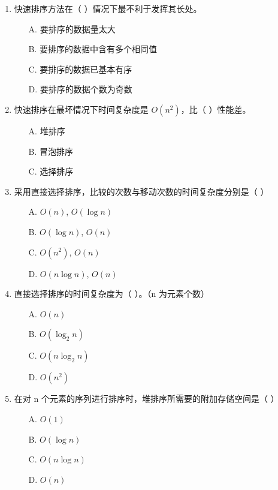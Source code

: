\documentclass[12pt, a4paper]{article}
\begin{document}
\begin{enumerate}[label=\arabic*.]
	\item 快速排序方法在（ ）情况下最不利于发挥其长处。
	      \begin{enumerate}
		      \item[A.] 要排序的数据量太大
		      \item[B.] 要排序的数据中含有多个相同值
		      \item[C.] 要排序的数据已基本有序
		      \item[D.] 要排序的数据个数为奇数
	      \end{enumerate}

	\item 快速排序在最坏情况下时间复杂度是 $O(n^2)$，比（ ）性能差。
	      \begin{enumerate}
		      \item[A.] 堆排序
		      \item[B.] 冒泡排序
		      \item[C.] 选择排序
	      \end{enumerate}

	\item 采用直接选择排序，比较的次数与移动次数的时间复杂度分别是（ ）
	      \begin{enumerate}
		      \item[A.] $O(n)$, $O(\log n)$
		      \item[B.] $O(\log n)$, $O(n)$
		      \item[C.] $O(n^2)$, $O(n)$
		      \item[D.] $O(n \log n)$, $O(n)$
	      \end{enumerate}

	\item 直接选择排序的时间复杂度为（ ）。（n 为元素个数）
	      \begin{enumerate}
		      \item[A.] $O(n)$
		      \item[B.] $O(\log_2 n)$
		      \item[C.] $O(n \log_2 n)$
		      \item[D.] $O(n^2)$
	      \end{enumerate}

	\item 在对 n 个元素的序列进行排序时，堆排序所需要的附加存储空间是（ ）
	      \begin{enumerate}
		      \item[A.] $O(1)$
		      \item[B.] $O(\log n)$
		      \item[C.] $O(n \log n)$
		      \item[D.] $O(n)$
	      \end{enumerate}


\end{enumerate}
\end{document}
